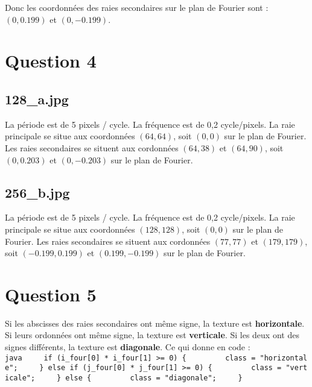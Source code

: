 \documentclass[french,]{article}
\begin{document}
Donc les coordonnées des raies secondaires sur le plan de Fourier sont :
\((0, 0.199)\) et \((0, -0.199)\).

\section{Question 4}\label{question-4}

\subsection{128\_a.jpg}\label{a.jpg}

La période est de 5 pixels / cycle. La fréquence est de 0,2
cycle/pixels. La raie principale se situe aux coordonnées \((64, 64)\),
soit \((0, 0)\) sur le plan de Fourier. Les raies secondaires se situent
aux cordonnées \((64, 38)\) et \((64, 90)\), soit \((0, 0.203)\) et
\((0, -0.203)\) sur le plan de Fourier.

\subsection{256\_b.jpg}\label{b.jpg}

La période est de 5 pixels / cycle. La fréquence est de 0,2
cycle/pixels. La raie principale se situe aux coordonnées
\((128, 128)\), soit \((0, 0)\) sur le plan de Fourier. Les raies
secondaires se situent aux cordonnées \((77, 77)\) et \((179, 179)\),
soit \((-0.199, 0.199)\) et \((0.199, -0.199)\) sur le plan de Fourier.

\section{Question 5}\label{question-5}

Si les abscisses des raies secondaires ont même signe, la texture est
\textbf{horizontale}. Si leurs ordonnées ont même signe, la texture est
\textbf{verticale}. Si les deux ont des signes différents, la texture
est \textbf{diagonale}. Ce qui donne en code :
\texttt{java\ \ \ \ \ if\ (i\_four{[}0{]}\ *\ i\_four{[}1{]}\ \textgreater{}=\ 0)\ \{\ \ \ \ \ \ \ \ \ class\ =\ "horizontale";\ \ \ \ \ \}\ else\ if\ (j\_four{[}0{]}\ *\ j\_four{[}1{]}\ \textgreater{}=\ 0)\ \{\ \ \ \ \ \ \ \ \ class\ =\ "verticale";\ \ \ \ \ \}\ else\ \{\ \ \ \ \ \ \ \ \ class\ =\ "diagonale";\ \ \ \ \ \}}
\end{document}
